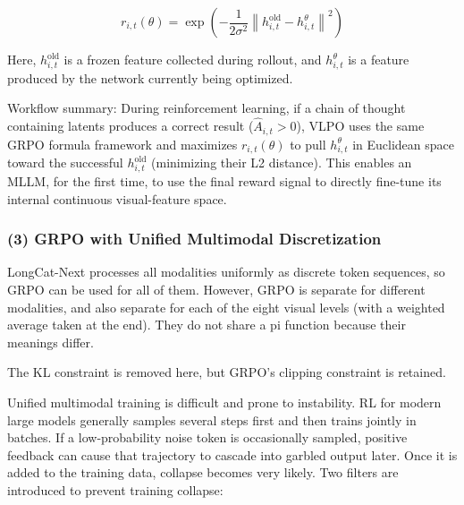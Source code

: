\[
r_{i,t}(\theta)=
\exp\left(
-\frac{1}{2\sigma^2}
\left\lVert h_{i,t}^{\mathrm{old}}-h_{i,t}^{\theta}\right\rVert^2
\right)
\]

Here, \(h_{i,t}^{\mathrm{old}}\) is a frozen feature collected during rollout, and \(h_{i,t}^{\theta}\) is a feature produced by the network currently being optimized.

Workflow summary: During reinforcement learning, if a chain of thought containing latents produces a correct result (\(\hat A_{i,t}>0\)), VLPO uses the same GRPO formula framework and maximizes \(r_{i,t}(\theta)\) to pull \(h_{i,t}^{\theta}\) in Euclidean space toward the successful \(h_{i,t}^{\mathrm{old}}\) (minimizing their L2 distance). This enables an MLLM, for the first time, to use the final reward signal to directly fine-tune its internal continuous visual-feature space.

\hypertarget{grpo-with-unified-multimodal-discretization}{%
\subsubsection{(3) GRPO with Unified Multimodal Discretization}\label{grpo-with-unified-multimodal-discretization}}

LongCat-Next processes all modalities uniformly as discrete token sequences, so GRPO can be used for all of them. However, GRPO is separate for different modalities, and also separate for each of the eight visual levels (with a weighted average taken at the end). They do not share a pi function because their meanings differ.

The KL constraint is removed here, but GRPO's clipping constraint is retained.

Unified multimodal training is difficult and prone to instability. RL for modern large models generally samples several steps first and then trains jointly in batches. If a low-probability noise token is occasionally sampled, positive feedback can cause that trajectory to cascade into garbled output later. Once it is added to the training data, collapse becomes very likely. Two filters are introduced to prevent training collapse:

